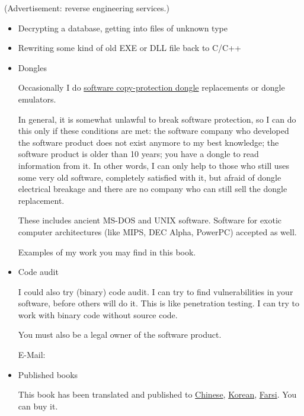 
(Advertisement: reverse engineering services.)

\begin{itemize}
\item Decrypting a database, getting into files of unknown type

\item Rewriting some kind of old EXE or DLL file back to C/C++

\item Dongles

Occasionally I do \href{https://en.wikipedia.org/wiki/Software_protection_dongle}{software copy-protection dongle} replacements or dongle emulators.

In general, it is somewhat unlawful to break software protection, so I can do this only if these conditions are met:
the software company who developed the software product does not exist anymore to my best knowledge;
the software product is older than 10 years;
you have a dongle to read information from it. In other words, I can only help to those who still uses some very old software, completely satisfied with it, but afraid of dongle electrical breakage and there are no company who can still sell the dongle replacement.

These includes ancient MS-DOS and UNIX software. Software for exotic computer architectures (like MIPS, DEC Alpha, PowerPC) accepted as well.

Examples of my work you may find in this book.

\item Code audit

I could also try (binary) code audit.
I can try to find vulnerabilities in your software, before others will do it.
This is like penetration testing.
I can try to work with binary code without source code.

You must also be a legal owner of the software product.

E-Mail: \EMAIL %

\item Published books

This book has been translated and published to
\href{https://beginners.re/#chinese}{Chinese},
\href{https://beginners.re/#acorn}{Korean},
\href{https://beginners.re/#farsi}{Farsi}.
You can buy it.

\end{itemize}

